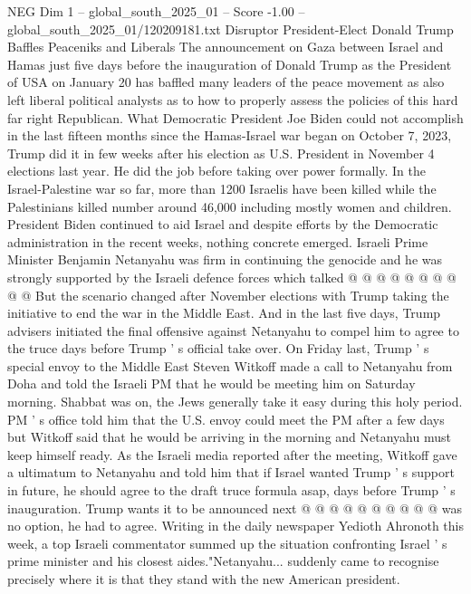 \begin{textsample}{NEG Dim 1 – global\_south\_2025\_01 – Score -1.00 – global\_south\_2025\_01/120209181.txt}  \label{ex:f1_neg_147}
Disruptor President-Elect Donald Trump Baffles Peaceniks and Liberals The announcement on Gaza between Israel and Hamas just five days before the inauguration of Donald Trump as the President of USA on January 20 has baffled many leaders of the peace movement as also left liberal political analysts as to how to properly assess the policies of this hard far right Republican.
What Democratic President Joe Biden could not accomplish in the last fifteen months since the Hamas-Israel war began on October 7, 2023, Trump did it in few weeks after his election as U.S.
President in November 4 elections last year.
He did the job before taking over power formally.
In the Israel-Palestine war so far, more than 1200 Israelis have been killed while the Palestinians killed number around 46,000 including mostly women and children.
President Biden continued to aid Israel and despite efforts by the Democratic administration in the recent weeks, nothing concrete emerged.
Israeli Prime Minister Benjamin Netanyahu was firm in continuing the genocide and he was strongly supported by the Israeli defence forces which talked @ @ @ @ @ @ @ @ @ @ But the scenario changed after November elections with Trump taking the initiative to end the war in the Middle East.
And in the last five days, Trump advisers initiated the final offensive against Netanyahu to compel him to agree to the truce days before Trump ' s official take over.
On Friday last, Trump ' s special envoy to the Middle East Steven Witkoff made a call to Netanyahu from Doha and told the Israeli PM that he would be meeting him on Saturday morning.
Shabbat was on, the Jews generally take it easy during this holy period.
PM ' s office told him that the U.S. envoy could meet the PM after a few days but Witkoff said that he would be arriving in the morning and Netanyahu must keep himself ready.
As the Israeli media reported after the meeting, Witkoff gave a ultimatum to Netanyahu and told him that if Israel wanted Trump ' s support in future, he should agree to the draft truce formula asap, days before Trump ' s inauguration.
Trump wants it to be announced next @ @ @ @ @ @ @ @ @ @ was no option, he had to agree.
Writing in the daily newspaper Yedioth Ahronoth this week, a top Israeli commentator summed up the situation confronting Israel ' s prime minister and his closest aides."Netanyahu... suddenly came to recognise precisely where it is that they stand with the new American president.

\end{textsample}
